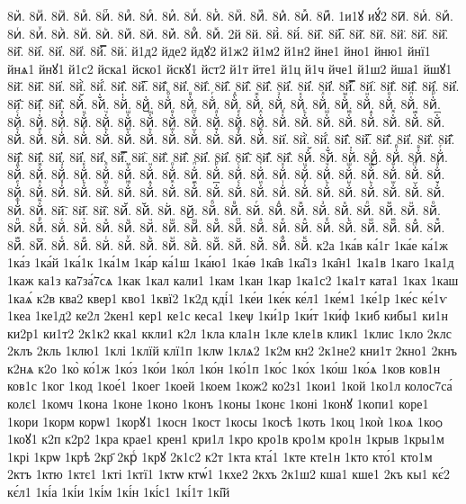 {8иⷱ.
8иⷲ.
8иⷳ.
8иⷴ.
8иⷵ.
8иⷶ.
8иⷷ.
8иⷸ.
8иⷹ.
8иⷺ.
8иⷻ.
8иⷼ.
8иⷽ.
8иⷾ.
8иⷿ.
1и1ꙋ
иꙋ́2
8и꙯.
8иꙴ.
8иꙵ.
8иꙶ.
8иꙷ.
8иꙸ.
8иꙹ.
8иꙺ.
8иꙻ.
8и꙼.
8и꙽.
8иꚞ.
8иꚟ.
2й
8й.
8й̀.
8й́.
8й̂.
8й̅.
8й̆.
8й̇.
8й̈.
8й̋.
8й̏.
8й̑.
8й̓.
8й̔.
8й̾.
8й̿.
8й͘.
й1д2
йде2
йдꙋ2
й1ж2
й1м2
й1н2
йне1
йно1
йню1
йнї1
йнѧ1
йнꙋ1
й1с2
йска1
йско1
йскꙋ1
йст2
й1т
йте1
й1ц
й1ч
йче1
й1ш2
йша1
йшꙋ1
8й҃.
8й҄.
8й҅.
8й҅̀.
8й҅́.
8й҅̂.
8й҅̅.
8й҅̆.
8й҅̇.
8й҅̈.
8й҅̋.
8й҅̏.
8й҅̑.
8й҅̓.
8й҅̔.
8й҅̾.
8й҅̿.
8й҅͘.
8й҅҃.
8й҅҄.
8й҅҅.
8й҅҆.
8й҅҇.
8й҅᷀.
8й҅᷁.
8й҅᷶.
8й᷷҅.
8й᷸҅.
8й᷹҅.
8й҅ⷠ.
8й҅ⷡ.
8й҅ⷢ.
8й҅ⷣ.
8й҅ⷤ.
8й҅ⷥ.
8й҅ⷦ.
8й҅ⷧ.
8й҅ⷨ.
8й҅ⷩ.
8й҅ⷪ.
8й҅ⷫ.
8й҅ⷬ.
8й҅ⷭ.
8й҅ⷮ.
8й҅ⷯ.
8й҅ⷰ.
8й҅ⷱ.
8й҅ⷲ.
8й҅ⷳ.
8й҅ⷴ.
8й҅ⷵ.
8й҅ⷶ.
8й҅ⷷ.
8й҅ⷸ.
8й҅ⷹ.
8й҅ⷺ.
8й҅ⷻ.
8й҅ⷼ.
8й҅ⷽ.
8й҅ⷾ.
8й҅ⷿ.
8й҅꙯.
8й҅ꙴ.
8й҅ꙵ.
8й҅ꙶ.
8й҅ꙷ.
8й҅ꙸ.
8й҅ꙹ.
8й҅ꙺ.
8й҅ꙻ.
8й҅꙼.
8й҅꙽.
8й҅ꚞ.
8й҅ꚟ.
8й҆.
8й҆̀.
8й҆́.
8й҆̂.
8й҆̅.
8й҆̆.
8й҆̇.
8й҆̈.
8й҆̋.
8й҆̏.
8й҆̑.
8й҆̓.
8й҆̔.
8й҆̾.
8й҆̿.
8й҆͘.
8й҆҃.
8й҆҄.
8й҆҅.
8й҆҆.
8й҆҇.
8й҆᷀.
8й҆᷁.
8й҆᷶.
8й᷷҆.
8й᷸҆.
8й᷹҆.
8й҆ⷠ.
8й҆ⷡ.
8й҆ⷢ.
8й҆ⷣ.
8й҆ⷤ.
8й҆ⷥ.
8й҆ⷦ.
8й҆ⷧ.
8й҆ⷨ.
8й҆ⷩ.
8й҆ⷪ.
8й҆ⷫ.
8й҆ⷬ.
8й҆ⷭ.
8й҆ⷮ.
8й҆ⷯ.
8й҆ⷰ.
8й҆ⷱ.
8й҆ⷲ.
8й҆ⷳ.
8й҆ⷴ.
8й҆ⷵ.
8й҆ⷶ.
8й҆ⷷ.
8й҆ⷸ.
8й҆ⷹ.
8й҆ⷺ.
8й҆ⷻ.
8й҆ⷼ.
8й҆ⷽ.
8й҆ⷾ.
8й҆ⷿ.
8й҆꙯.
8й҆ꙴ.
8й҆ꙵ.
8й҆ꙶ.
8й҆ꙷ.
8й҆ꙸ.
8й҆ꙹ.
8й҆ꙺ.
8й҆ꙻ.
8й҆꙼.
8й҆꙽.
8й҆ꚞ.
8й҆ꚟ.
8й҇.
8й᷀.
8й᷁.
8й᷶.
8й᷷.
8й᷸.
8й᷹.
8йⷠ.
8йⷡ.
8йⷢ.
8йⷣ.
8йⷤ.
8йⷥ.
8йⷦ.
8йⷧ.
8йⷨ.
8йⷩ.
8йⷪ.
8йⷫ.
8йⷬ.
8йⷭ.
8йⷮ.
8йⷯ.
8йⷰ.
8йⷱ.
8йⷲ.
8йⷳ.
8йⷴ.
8йⷵ.
8йⷶ.
8йⷷ.
8йⷸ.
8йⷹ.
8йⷺ.
8йⷻ.
8йⷼ.
8йⷽ.
8йⷾ.
8йⷿ.
8й꙯.
8йꙴ.
8йꙵ.
8йꙶ.
8йꙷ.
8йꙸ.
8йꙹ.
8йꙺ.
8йꙻ.
8й꙼.
8й꙽.
8йꚞ.
8йꚟ.
к2а
1ка́в
ка́1г
1ка́е
ка́1ж
1ка́з
1ка́й
1ка́1к
1ка́1м
1ка́р
ка́1ш
1ка́ю1
1ка́ѳ
1ка̑в
1ка̑1з
1ка̑н1
1ка1в
1каго
1ка1д
1каж
ка1з
ка7за́7сѧ
1как
1кал
кали1
1кам
1кан
1кар
1ка1с2
1ка1т
ката1
1ках
1каш
1каѧ́
к2в
ква2
квер1
кво1
1квї2
1к2д
кді́1
1ке́и
1ке́к
ке́л1
1ке́м1
1ке́1р
1ке́с
ке́1ѵ
1кеа
1ке1д2
ке2л
2кен1
кер1
ке1с
кеса1
1кеѱ
1ки́1р
1ки́т
1ки́ф
1киб
кибы1
ки1н
ки2р1
ки1т2
2к1к2
кка1
ккли1
к2л
1кла
кла1н
1кле
кле1в
клик1
1клис
1кло
2клс
2клъ
2кль
1клю1
1клі
1клїй
клї1п
1клѡ
1клѧ2
1к2м
кн2
2к1не2
кни1т
2кно1
2кнъ
к2нѧ
к2о
1ко̀
ко́1ж
1ко́з
1ко́и
1ко́л
1ко́н
1ко́1п
1ко́с
1ко́х
1ко́ш
1ко́ѧ
1ков
ков1н
ков1с
1ког
1код
1кое́1
1коег
1коей
1коем
1кож2
ко2з1
1кои1
1кой
1ко1л
колос7са́
колє1
1комч
1кона
1коне
1коно
1конъ
1коны
1конє
1коні
1конꙋ
1копи1
коре1
1кори
1корм
корѡ1
1корꙋ1
1косн
1кост
1косы
1косѣ
1коть
1коц
1коѝ
1коѧ
1коѻ
1коꙋ1
к2п
к2р2
1кра
крае1
крен1
кри1л
1кро
кро1в
кро1м
кро1н
1крыв
1кры1м
1крі
1крѡ
1крѣ
2кр҃
2крⷭ
1крꙋ
2к1с2
к2т
1кта
кта́1
1кте
кте1н
1кто
кто́1
кто1м
2ктъ
1ктю
1ктє1
1кті
1ктї1
1ктѡ
ктѡ́1
1кхе2
2кхъ
2к1ш2
кша1
кше1
2къ
кы1
кє́2
кє́л1
1кі́а
1кі́и
1кі́м
1кі́н
1кі́с1
1кі́1т
1кі̑й
}
